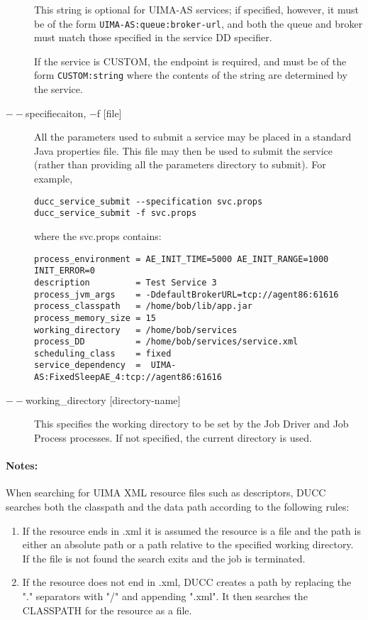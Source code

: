 \begin{description}
        This string is optional for UIMA-AS services; if specified, however, it must be of the
        form {\tt UIMA-AS:queue:broker-url}, and both the queue and broker must match those specified in the
        service DD specifier.

        If the service is CUSTOM, the endpoint is required, and must be of the form
        {\tt CUSTOM:string} where the contents of the string are determined by the service.

      \item[$--$specifiecaiton, $-$f {[file]}] All the parameters used to submit a service may be placed in a
        standard Java properties file.  This file may then be used to submit the service (rather than
        providing all the parameters directory to submit).
        For example, 

\begin{verbatim}
ducc_service_submit --specification svc.props 
ducc_service_submit -f svc.props 
\end{verbatim}
        
        where the svc.props contains: 

\begin{verbatim}
process_environment = AE_INIT_TIME=5000 AE_INIT_RANGE=1000 INIT_ERROR=0
description         = Test Service 3
process_jvm_args    = -DdefaultBrokerURL=tcp://agent86:61616
process_classpath   = /home/bob/lib/app.jar
process_memory_size = 15
working_directory   = /home/bob/services
process_DD          = /home/bob/services/service.xml
scheduling_class    = fixed
service_dependency  =  UIMA-AS:FixedSleepAE_4:tcp://agent86:61616
\end{verbatim}
        
        \item[$--$working\_directory {[directory-name]}]
          This specifies the working directory to be set by the Job Driver and Job Process processes. 
          If not specified, the current directory is used.
    \end{description}
        
    \paragraph{Notes:}
    When searching for UIMA XML resource files such as descriptors, DUCC searches both the 
    classpath and the data path according to the following rules: 

    \begin{enumerate}
        \item If the resource ends in .xml it is assumed the resource is a file and the path is either
          an absolute path or a path relative to the specified working directory. If the file is not
          found the search exits and the job is terminated.

        \item If the resource does not end in .xml, DUCC creates a path by replacing the "." 
          separators with "/" and appending ".xml". It then searches the CLASSPATH for the 
          resource as a file. 
    \end{enumerate}

